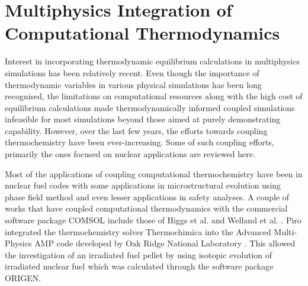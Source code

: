 
\section{Multiphysics Integration of Computational Thermodynamics}

	Interest in incorporating thermodynamic equilibrium calculations in multiphysics simulations has been relatively recent. Even though the importance of thermodynamic variables in various physical simulations has been long recognised, the limitations on computational resources along with the high cost of equilibrium calculations made thermodynamically informed coupled simulations infeasible for most simulations beyond those aimed at purely demonstrating capability. However, over the last few years, the efforts towards coupling thermochemistry have been ever-increasing. Some of such coupling efforts, primarily the ones focused on nuclear applications are reviewed here. 
	
	Most of the applications of coupling computational thermochemistry have been in nuclear fuel codes with some applications in microstructural evolution using phase field method and even lesser applications in safety analyses. A couple of works that have coupled computational thermodynamics with the commercial software package COMSOL include those of Higgs et al. \cite{Higgs:2007aa} and Welland et al. \cite{Welland09}. Piro integrated the thermochemistry solver {Thermochimica} into the Advanced Multi-Physics {AMP} code developed by Oak Ridge National Laboratory \cite{Piro11b}. This allowed the investigation of an irradiated fuel pellet by using isotopic evolution of irradiated nuclear fuel which was calculated through the software package {ORIGEN}. 

